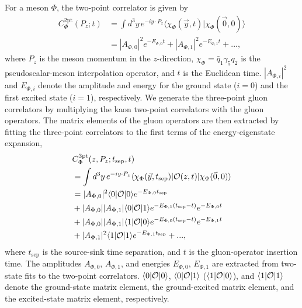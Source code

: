 For a meson $\Phi$, the two-point correlator is given by
%
\begin{align}
C_\Phi^\text{2pt}(P_z;t)&=
 \int d^3y\, e^{-i y\cdot P_z} \langle \chi_\Phi(\vec{y},t)|\chi_\Phi(\vec{0},0)\rangle \nonumber \\
  &= |A_{\Phi,0}|^2 e^{-E_{\Phi,0}t} + |A_{\Phi,1}|^2 e^{-E_{\Phi,1}t} + ...,
\label{eq:2pt_fit_formula}
\end{align}
%
where $P_z$ is the meson momentum in the $z$-direction, $\chi_\Phi=\bar{q}_1\gamma_5 q_2$ is the pseudoscalar-meson interpolation operator, and $t$ is the Euclidean time.
$|A_{\Phi,i}|^2$ and $E_{\Phi,i}$ denote the amplitude and energy for the ground state ($i=0$) and the first excited state ($i=1$), respectively.
We generate the three-point gluon correlators by multiplying the kaon two-point correlators with the gluon operators.
The matrix elements of the gluon operators are then extracted by fitting the three-point correlators to the first terms of the energy-eigenstate expansion,
%
\begin{align}\label{eq:3ptC}
&C_\Phi^\text{3pt}(z,P_z;t_\text{sep},t) \nonumber \\
&=\int d^3y\, e^{-iy\cdot P_z}\langle \chi_\Phi(\vec y,t_\text{sep})|{\cal O}(z,t)|\chi_\Phi(\vec 0,0)\rangle \nonumber \\
&= |A_{\Phi,0}|^2\langle 0|{\cal O}|0\rangle e^{-E_{\Phi,0}t_\text{sep}} \nonumber \\
&+ |A_{\Phi,0}||A_{\Phi,1}|\langle 0|{\cal O}|1\rangle e^{-E_{\Phi,1}(t_\text{sep}-t)}e^{-E_{\Phi,0}t} \nonumber \\
&+ |A_{\Phi,0}||A_{\Phi,1}|\langle 1|{\cal O}|0\rangle e^{-E_{\Phi,0}(t_\text{sep}-t)}e^{-E_{\Phi,1}t} \nonumber \\
&+ |A_{\Phi,1}|^2\langle 1|{\cal O}|1\rangle e^{-E_{\Phi,1}t_\text{sep}}+ ...,
\end{align}
%
where $t_{\text{sep}}$ is the source-sink time separation, and $t$ is the gluon-operator insertion time.
The amplitudes $A_{\Phi,0}$, $A_{\Phi,1}$, and energies $E_{\Phi,0}$, $E_{\Phi,1}$ are extracted from two-state fits to the two-point correlators.
$\langle 0|{\cal O}|0\rangle$, $\langle 0|{\cal O}|1\rangle$ ($\langle 1|{\cal O}|0\rangle$), and $\langle 1|{\cal O}|1\rangle$ denote the ground-state matrix element, the ground-excited matrix element, and the excited-state matrix element, respectively.




